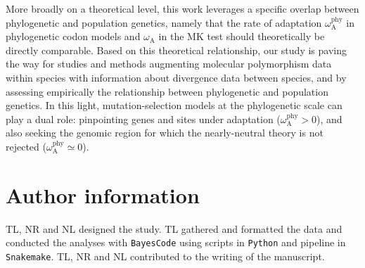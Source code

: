 \documentclass[9pt,twocolumn,twoside,lineno]{pnas-new}
\newcommand{\rateApop}{\omega_{\mathrm{A}}}
\newcommand{\rateAphy}{\rateApop^{\mathrm{phy}}}
\begin{document}
More broadly on a theoretical level, this work leverages a specific overlap between phylogenetic and population genetics, namely that the rate of adaptation $\rateAphy$ in phylogenetic codon models and $\rateApop$ in the MK test should theoretically be directly comparable.
Based on this theoretical relationship, our study is paving the way for studies and methods augmenting molecular polymorphism data within species with information about divergence data between species\cite{chen_hunting_2021}, and by assessing empirically the relationship between phylogenetic and population genetics\cite{thorne_codon_2012}.
In this light, mutation-selection models at the phylogenetic scale can play a dual role: pinpointing genes and sites under adaptation ($\rateAphy > 0$), and also seeking the genomic region for which the nearly-neutral theory is not rejected ($\rateAphy \simeq 0$).


\section{Author information}\label{sec:author-information}
TL, NR and NL designed the study.
TL gathered and formatted the data and conducted the analyses with \texttt{BayesCode} using scripts in \texttt{Python} and pipeline in \texttt{Snakemake}.
TL, NR and NL contributed to the writing of the manuscript.
\end{document}
